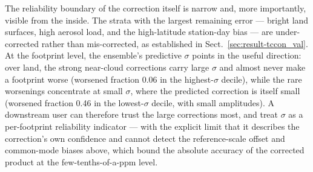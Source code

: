 The reliability boundary of the correction itself is narrow and, more importantly, visible from the inside. The strata with the largest remaining error — bright land surfaces, high aerosol load, and the high-latitude station-day bias — are under-corrected rather than mis-corrected, as established in Sect.~\ref{sec:result-tccon_val}. At the footprint level, the ensemble's predictive $\sigma$ points in the
useful direction: over land, the strong near-cloud corrections carry large $\sigma$ and almost never make a footprint worse (worsened fraction 0.06 in the highest-$\sigma$ decile), while the rare worsenings concentrate at small $\sigma$, where the predicted correction is itself small (worsened fraction 0.46 in the lowest-$\sigma$ decile, with small amplitudes). A downstream user can therefore trust the large corrections most, and treat $\sigma$ as a per-footprint reliability indicator — with the explicit limit that it describes the correction's own confidence and cannot detect the reference-scale offset and common-mode biases above, which bound the absolute accuracy of the corrected product at the few-tenths-of-a-ppm level.
